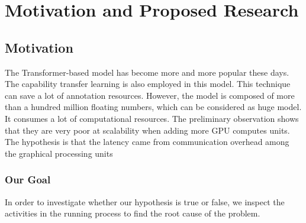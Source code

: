 \section{Motivation and Proposed Research}



\subsection{Motivation}
\label{sec:motiv}

The Transformer-based model has become more and more popular these days. The capability transfer learning is also employed in this model. This technique can save a lot of annotation resources. However, the model is composed of more than a hundred million floating numbers, which can be considered as huge model. It consumes a lot of computational resources. The preliminary observation shows that they are very poor at scalability when adding more GPU computes units. The hypothesis is that the latency came from communication overhead among the graphical processing units



\subsubsection{Our Goal}
\label{sec:goal}

In order to investigate whether our hypothesis is true or false, we inspect the activities in the running process to find the root cause of the problem. 


